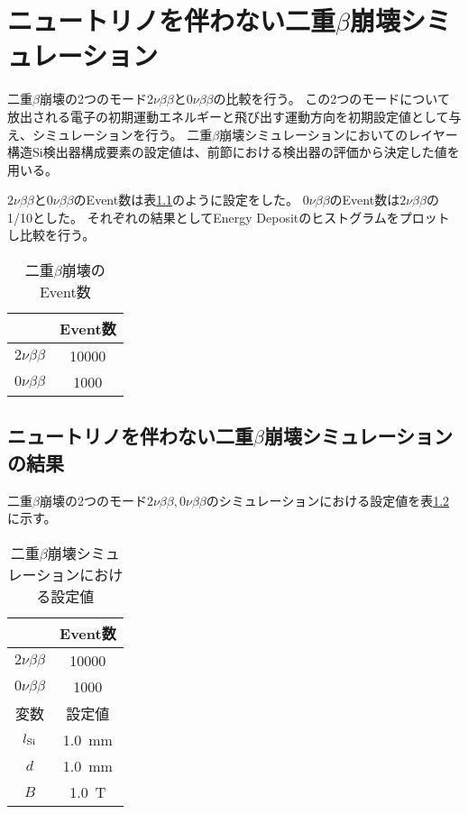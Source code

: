 \documentclass[a4paper,10pt]{jreport}
\begin{document}
\chapter{ニュートリノを伴わない二重$\beta$崩壊シミュレーション}

二重$\beta$崩壊の2つのモード$2\nu\beta\beta$と$0\nu\beta\beta$の比較を行う。
この2つのモードについて放出される電子の初期運動エネルギーと飛び出す運動方向を初期設定値として与え、シミュレーションを行う。
二重$\beta$崩壊シミュレーションにおいてのレイヤー構造Si検出器構成要素の設定値は、前節における検出器の評価から決定した値を用いる。

$2\nu\beta\beta$と$0\nu\beta\beta$のEvent数は表\ref{Tab-DoubleBetaDecay}のように設定をした。
$0\nu\beta\beta$のEvent数は$2\nu\beta\beta$の1/10とした。
それぞれの結果としてEnergy Depositのヒストグラムをプロットし比較を行う。

\begin{table}[H] 
	\center
	\caption{二重$\beta$崩壊のEvent数} \label{Tab-DoubleBetaDecay}
	\begin{tabular}{cc}
	\hline
	 & Event数 \\
	 \hline
	$2\nu\beta\beta$ & 10000 \\
	$0\nu\beta\beta$ & 1000 \\
	\hline
	\end{tabular}
\end{table}







\section{ニュートリノを伴わない二重$\beta$崩壊シミュレーションの結果}

二重$\beta$崩壊の2つのモード$2\nu\beta\beta,0\nu\beta\beta$のシミュレーションにおける設定値を表\ref{Tab-DoubleBetaDecay-Settei}に示す。

\begin{table}[H] 
	\center
	\caption{二重$\beta$崩壊シミュレーションにおける設定値} \label{Tab-DoubleBetaDecay-Settei}
	\begin{tabular}{cc}
	\hline
	 & Event数 \\
	 \hline
	$2\nu\beta\beta$ & 10000 \\
	$0\nu\beta\beta$ & 1000 \\
	\hline
	変数 & 設定値 \\
	\hline
	$l_{\rm{Si}}$ & \SI{1.0}{mm} \\
	$d$ & \SI{1.0}{mm} \\
	$B$ & \SI{1.0}{T} \\
	\hline
	\end{tabular}
\end{table}
\end{document}
